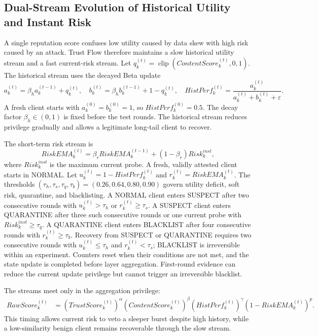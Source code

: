 \documentclass[11pt, a4paper]{article}
\begin{document}
\subsection{Dual-Stream Evolution of Historical Utility and Instant Risk}
A single reputation score confuses low utility caused by data skew with high
risk caused by an attack. Trust Flow therefore maintains a slow historical
utility stream and a fast current-risk stream. Let
$q_k^{(t)}=\operatorname{clip}(ContentScore_k^{(t)},0,1)$. The historical stream
uses the decayed Beta update
\begin{equation}
    a_k^{(t)}=\beta_h a_k^{(t-1)}+q_k^{(t)},\quad
    b_k^{(t)}=\beta_h b_k^{(t-1)}+1-q_k^{(t)},\quad
    HistPerf_k^{(t)}=\frac{a_k^{(t)}}{a_k^{(t)}+b_k^{(t)}+\varepsilon}.
\end{equation}
A fresh client starts with $a_k^{(0)}=b_k^{(0)}=1$, so
$HistPerf_k^{(0)}=0.5$. The decay factor $\beta_h\in(0,1)$ is fixed before the
test rounds. The historical stream reduces privilege gradually and allows a
legitimate long-tail client to recover.

The short-term risk stream is
\begin{equation}
    RiskEMA_k^{(t)}=\beta_rRiskEMA_k^{(t-1)}
    +(1-\beta_r)Risk_k^{inst},
\end{equation}
where $Risk_k^{inst}$ is the maximum current probe. A fresh, validly attested
client starts in NORMAL. Let
$u_k^{(t)}=1-HistPerf_k^{(t)}$ and
$r_k^{(t)}=RiskEMA_k^{(t)}$. The thresholds
$(\tau_h,\tau_s,\tau_q,\tau_b)=(0.26,0.64,0.80,0.90)$ govern utility deficit,
soft risk, quarantine, and blacklisting. A NORMAL client enters SUSPECT after
two consecutive rounds with $u_k^{(t)}>\tau_h$ or $r_k^{(t)}\geq\tau_s$. A
SUSPECT client enters QUARANTINE after three such consecutive rounds or one
current probe with $Risk_k^{inst}\geq\tau_q$. A QUARANTINE client enters
BLACKLIST after four consecutive rounds with $r_k^{(t)}\geq\tau_b$. Recovery
from SUSPECT or QUARANTINE requires two consecutive rounds with
$u_k^{(t)}\leq\tau_h$ and $r_k^{(t)}<\tau_s$; BLACKLIST is irreversible within
an experiment. Counters reset when their conditions are not met, and the state
update is completed before layer aggregation. First-round evidence can reduce
the current update privilege but cannot trigger an irreversible blacklist.

The streams meet only in the aggregation privilege:
\begin{align}
    RawScore_k^{(t)} &=(TrustScore_k^{(t)})^\alpha
    (ContentScore_k^{(t)})^\beta(HistPerf_k^{(t)})^\gamma
    (1-RiskEMA_k^{(t)})^p.
\end{align}
This timing allows current risk to veto a sleeper burst despite high history,
while a low-similarity benign client remains recoverable through the slow stream.
\end{document}
